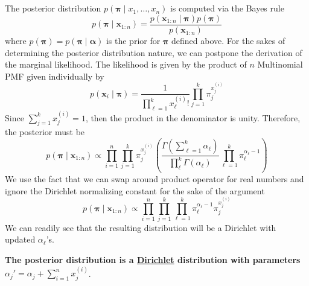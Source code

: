 \documentclass{article}
\numberwithin{equation}{section}
\begin{document}
\subsection{}
The posterior distribution $p( \bm{ \pi} \mid x_1 , \dots , x_n) $ is computed via 
the Bayes rule
\[
        p(\bm{ \pi} \mid \mathbf{x}_{1:n}) = 
        \frac{p(\mathbf{x}_{1:n} \mid \bm{ \pi} ) p(\bm{ \pi}) }{p(\mathbf{x}_{1:n})}
\]
where $p(\bm{ \pi} ) = p(\bm{ \pi} \mid \bm{\alpha} )$ is the prior for $\bm{ \pi} $
defined above. For the sakes of determining the 
posterior distribution nature, we can postpone the derivation of the marginal likelihood.
The likelihood 
is given by the product of $n$ Multinomial PMF given individually by
\[
        p(\mathbf{x}_i \mid \bm{ \pi} ) = \frac{1}{\prod_{\ell=1}^k x^{(i)}_\ell!} 
        \prod_{j=1}^k \pi_j^{x^{(i)}_j}
\]
Since $\sum_{j=1}^kx^{(i)}_j = 1$, then the product in the denominator is unity.
Therefore, the posterior must be
\[
        p(\bm{ \pi} \mid \mathbf{x}_{1:n} ) \propto 
        \prod_{i = 1}^n \prod_{j=1}^k \pi_j^{x_j^{(i)}}
        \left( \frac{\Gamma(\sum_{\ell = 1}^k \alpha_\ell)}{\prod_{\ell}^k \Gamma(\alpha_{\ell})}
                \prod_{\ell = 1}^k \pi_\ell^{\alpha_\ell -1}
        \right) 
\]
We use the fact that we can swap around product operator for real numbers and ignore 
the Dirichlet normalizing constant for the sake of the argument
\[
         p(\bm{ \pi} \mid \mathbf{x}_{1:n} ) \propto 
        \prod_{i = 1}^n \prod_{j=1}^k 
                      \prod_{\ell = 1}^k \pi_\ell^{\alpha_\ell -1}\pi_j^{x_j^{(i)}}

\]
We can readily see that the resulting distribution will be a Dirichlet with 
updated $\alpha_\ell$'s. 

\textbf{The posterior distribution is a \underline{Dirichlet} distribution with parameters 
$\alpha_j'= \alpha_j + \sum_{i = 1}^n x_j^{(i)} $}.
\end{document}
